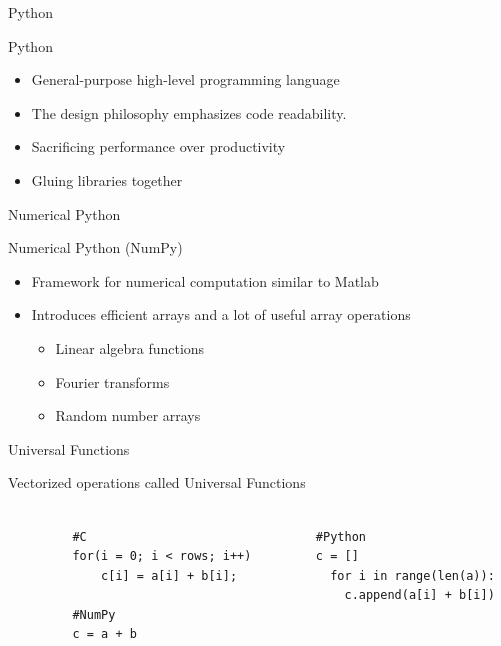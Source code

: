 \documentclass{beamer}
\begin{document}

\begin{frame}{Python}
\begin{center}
\begin{Large}
Python
\end{Large}
\end{center}
\begin{itemize}
\item General-purpose high-level programming language
\item The design philosophy emphasizes code readability.
\item Sacrificing performance over productivity
\item Gluing libraries together
\end{itemize}
\end{frame}


\begin{frame}[fragile]{Numerical Python}
\begin{center}
\begin{Large}
Numerical Python (NumPy)
\end{Large}
\end{center}
\begin{itemize}
  \item Framework for numerical computation similar to Matlab
  \item Introduces efficient arrays and a lot of useful array operations
\begin{itemize}
  \item Linear algebra functions
  \item Fourier transforms
  \item Random number arrays  
\end{itemize}
\end{itemize}
\end{frame}


\begin{frame}[fragile]{Universal Functions}
\begin{center}
Vectorized operations called Universal Functions
\end{center}
\begin{scriptsize}
\begin{verbatim}

         #C                                #Python
         for(i = 0; i < rows; i++)         c = []
             c[i] = a[i] + b[i];             for i in range(len(a)):
                                               c.append(a[i] + b[i])
         #NumPy
         c = a + b
\end{verbatim}
\end{scriptsize}
\end{frame}
\end{document}
